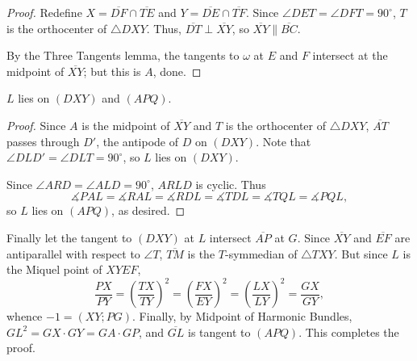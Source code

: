 \begin{proof}
    Redefine $X=\overline{DF}\cap\overline{TE}$ and $Y=\overline{DE}\cap\overline{TF}$. Since $\angle DET=\angle DFT=90^\circ$, $T$ is the orthocenter of $\triangle DXY$. Thus, $\overline{DT}\perp\overline{XY}$, so $\overline{XY}\parallel\overline{BC}$.

    By the Three Tangents lemma, the tangents to $\omega$ at $E$ and $F$ intersect at the midpoint of $\overline{XY}$; but this is $A$, done.
\end{proof}
\begin{iclaim}
    $L$ lies on $(DXY)$ and $(APQ)$.
\end{iclaim}
\begin{proof}
    Since $A$ is the midpoint of $\overline{XY}$ and $T$ is the orthocenter of $\triangle DXY$, $\overline{AT}$ passes through $D'$, the antipode of $D$ on $(DXY)$. Note that $\angle DLD'=\angle DLT=90^\circ$, so $L$ lies on $(DXY)$.

    Since $\angle ARD=\angle ALD=90^\circ$, $ARLD$ is cyclic. Thus \[\measuredangle PAL=\measuredangle RAL=\measuredangle RDL=\measuredangle TDL=\measuredangle TQL=\measuredangle PQL,\]
    so $L$ lies on $(APQ)$, as desired.
\end{proof}

Finally let the tangent to $(DXY)$ at $L$ intersect $\overline{AP}$ at $G$. Since $\overline{XY}$ and $\overline{EF}$ are antiparallel with respect to $\angle T$, $\overline{TM}$ is the $T$-symmedian of $\triangle TXY$. But since $L$ is the Miquel point of $XYEF$, \[\frac{PX}{PY}=\left(\frac{TX}{TY}\right)^2=\left(\frac{FX}{EY}\right)^2=\left(\frac{LX}{LY}\right)^2=\frac{GX}{GY},\]
whence $-1=(XY;PG)$. Finally, by Midpoint of Harmonic Bundles, $GL^2=GX\cdot GY=GA\cdot GP$, and $\overline{GL}$ is tangent to $(APQ)$. This completes the proof.

